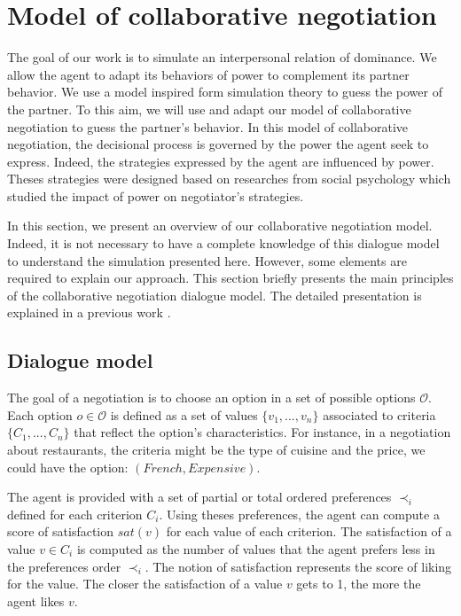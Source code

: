 \documentclass[conference, letterpaper]{IEEEtran}
\begin{document}
	
	\section{Model of collaborative negotiation}
	The goal of our work is to simulate an interpersonal relation of dominance. We allow the agent to adapt its behaviors of power to complement its partner behavior. We use a model inspired form simulation theory to guess the power of the partner. To this aim, we will use and adapt our model of collaborative negotiation to guess the partner's behavior. In this model of collaborative negotiation, the decisional process is governed by the power the agent seek to express. Indeed, the strategies expressed by the agent are influenced by power. Theses strategies were designed based on researches from social psychology which studied the impact of power on negotiator's strategies. 
	
	In this section, we present an overview of our collaborative negotiation model. Indeed, it is not necessary to have a complete knowledge of this dialogue model to understand the simulation presented here. However, some elements are required to explain our approach. This section briefly presents the main principles of the collaborative negotiation dialogue model. The detailed presentation is explained in a previous work \cite{ouali2017computational}.
	

	
	\subsection{Dialogue model}
	
	\label{sec:dialogue-model}
	
	The goal of a negotiation is to choose an option in a set of possible options $\mathcal{O}$. Each option $o\in\mathcal{O}$ is defined as a set of values $\{v_1, ..., v_n\}$ associated to criteria $\{C_1, ..., C_n\}$ that reflect the option's characteristics.  
	For instance, in a negotiation about restaurants, the criteria might be the type of cuisine and the price, we could have the option: $(French,Expensive)$.
	
	The agent is provided with a set of partial or total ordered preferences $\prec_i$ defined for each criterion $C_i$. Using theses preferences, the agent can compute a score of satisfaction $sat(v)$ for each value of each criterion. The satisfaction of a value $v \in C_i$ is computed as the number of values that the agent prefers less in the preferences order $\prec_i$. The notion of satisfaction represents the score of liking for the value. The closer the satisfaction of a value $v$ gets to 1, the more the agent likes $v$.
	 
\end{document}
